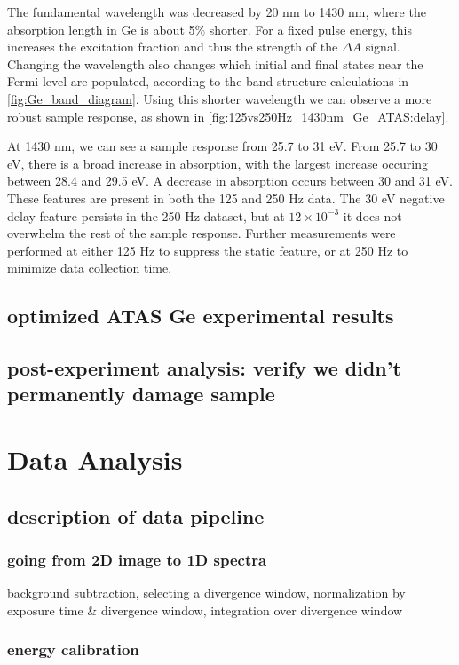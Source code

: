 The fundamental wavelength was decreased by 20 nm to 1430 nm, where the absorption length in Ge is about 5\% shorter. For a fixed pulse energy, this increases the excitation fraction and thus the strength of the $\Delta A$ signal. Changing the wavelength also changes which initial and final states near the Fermi level are populated, according to the band structure calculations in \cref{fig:Ge_band_diagram}. Using this shorter wavelength we can observe a more robust sample response, as shown in \cref{fig:125vs250Hz_1430nm_Ge_ATAS:delay}.

At 1430 nm, we can see a sample response from 25.7 to 31 eV. From 25.7 to 30 eV, there is a broad increase in absorption, with the largest increase occuring between 28.4 and 29.5 eV. A decrease in absorption occurs between 30 and 31 eV. These features are present in both the 125 and 250 Hz data. The 30 eV negative delay feature persists in the 250 Hz dataset, but at $12 \times 10^{-3}$ it does not overwhelm the rest of the sample response. Further measurements were performed at either 125 Hz to suppress the static feature, or at 250 Hz to minimize data collection time.


\subsection{optimized ATAS Ge experimental results}

\subsection{post-experiment analysis: verify we didn't permanently damage sample}

\section{Data Analysis}

\subsection{description of data pipeline}
\subsubsection{going from 2D image to 1D spectra}
background subtraction, selecting a divergence window, normalization by exposure time \& divergence window, integration over divergence window
\subsubsection{energy calibration}
